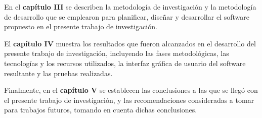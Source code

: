 	En el \textbf{cap\'{i}tulo III} se describen la metodolog\'{i}a de investigaci\'{o}n y la metodolog\'{i}a de desarrollo que se emplearon para planificar, dise\~{n}ar y desarrollar el software propuesto en el presente trabajo de investigaci\'{o}n.

	El \textbf{cap\'{i}tulo IV} muestra los resultados que fueron alcanzados en el desarrollo del presente trabajo de investigaci\'{o}n, incluyendo las fases metodol\'{o}gicas, las tecnolog\'{i}as y los recursos utilizados, la interfaz gr\'{a}fica de usuario del software resultante y las pruebas realizadas.

	Finalmente, en el \textbf{cap\'{i}tulo V} se establecen las conclusiones a las que se lleg\'{o} con el presente trabajo de investigaci\'{o}n, y las recomendaciones consideradas a tomar para trabajos futuros, tomando en cuenta dichas conclusiones.

	
	